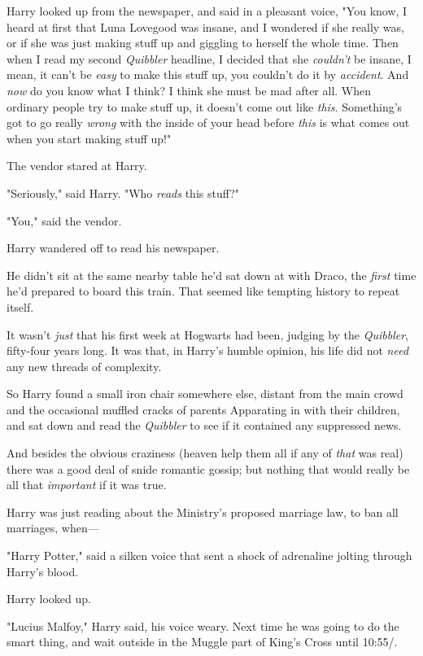 Harry looked up from the newspaper, and said in a pleasant voice, "You know, I
heard at first that Luna Lovegood was insane, and I wondered if she really was,
or if she was just making stuff up and giggling to herself the whole time. Then
when I read my second \emph{Quibbler} headline, I decided that she
\emph{couldn't} be insane, I mean, it can't be \emph{easy} to make this stuff
up, you couldn't do it by \emph{accident}. And \emph{now} do you know what I
think? I think she must be mad after all. When ordinary people try to make
stuff up, it doesn't come out like \emph{this}. Something's got to go really
\emph{wrong} with the inside of your head before \emph{this} is what comes out
when you start making stuff up!"

The vendor stared at Harry.

"Seriously," said Harry. "Who \emph{reads} this stuff?"

"You," said the vendor.

Harry wandered off to read his newspaper.

He didn't sit at the same nearby table he'd sat down at with Draco, the
\emph{first} time he'd prepared to board this train. That seemed like tempting
history to repeat itself.

It wasn't \emph{just} that his first week at Hogwarts had been, judging by the
\emph{Quibbler}, fifty-four years long. It was that, in Harry's humble opinion,
his life did not \emph{need} any new threads of complexity.

So Harry found a small iron chair somewhere else, distant from the main crowd
and the occasional muffled cracks of parents Apparating in with their children,
and sat down and read the \emph{Quibbler} to see if it contained any suppressed
news.

And besides the obvious craziness (heaven help them all if any of \emph{that}
was real) there was a good deal of snide romantic gossip; but nothing that
would really be all that \emph{important} if it was true.

Harry was just reading about the Ministry's proposed marriage law, to ban all
marriages, when---

"Harry Potter," said a silken voice that sent a shock of adrenaline jolting
through Harry's blood.

Harry looked up.

"Lucius Malfoy," Harry said, his voice weary. Next time he was going to do the
smart thing, and wait outside in the Muggle part of King's Cross until 10:55\AM/.

